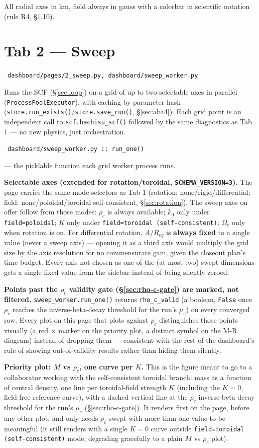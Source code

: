 \documentclass[11pt,a4paper]{scrartcl}
\newcommand{\arrowto}[1]{%
  \par\vspace{2pt}\noindent{\color{linkblue}$\rightarrow$}~\texttt{\small #1}\par\vspace{2pt}}
\newcommand{\code}[1]{\texttt{\small #1}}
\begin{document}
All radial axes in km, field always in gauss with a colorbar in
scientific notation (rule R4, \S1.10).

\section{Tab 2 --- Sweep}
\label{sec:aba2}

\arrowto{dashboard/pages/2\_sweep.py, dashboard/sweep\_worker.py}

Runs the SCF (\S\ref{sec:loop}) on a grid of up to two selectable axes in
parallel (\code{ProcessPoolExecutor}), with caching by parameter hash
(\code{store.run\_exists()}/\code{store.save\_run()}, \S\ref{sec:aba4}).
Each grid point is an independent call to \code{scf.hachisu\_scf()}
followed by the same diagnostics as Tab 1 --- no new physics, just
orchestration.

\arrowto{dashboard/sweep\_worker.py :: run\_one()} --- the picklable function each grid worker process runs.

\textbf{Selectable axes (extended for rotation/toroidal,
\code{SCHEMA\_VERSION=3}).} The page carries the same mode selectors as
Tab 1 (rotation: none/rigid/differential; field: none/poloidal/toroidal
self-consistent, \S\ref{sec:rotation}). The sweep axes on offer follow
from those modes: $\rho_c$ is always available; $k_0$ only under
\code{field=poloidal}; $K$ only under \code{field=toroidal
(self-consistent)}; $\Omega_c$ only when rotation is on. For
differential rotation, $A/R_{eq}$ is \textbf{always fixed} to a single
value (never a sweep axis) --- opening it as a third axis would multiply
the grid size by the axis resolution for no commensurate gain, given the
closeout plan's time budget. Every axis not chosen as one of the (at
most two) swept dimensions gets a single fixed value from the sidebar
instead of being silently zeroed.

\textbf{Points past the $\rho_c$ validity gate (\S\ref{sec:rho-c-gate})
are marked, not filtered.} \code{sweep\_worker.run\_one()} returns
\code{rho\_c\_valid} (a boolean, \code{False} once $\rho_c$ reaches the
inverse-beta-decay threshold for the run's $\mu_e$) on every converged
row. Every plot on this page that plots against $\rho_c$ distinguishes
those points visually (a red $\times$ marker on the priority plot, a
distinct symbol on the M-R diagram) instead of dropping them ---
consistent with the rest of the dashboard's rule of showing
out-of-validity results rather than hiding them silently.

\textbf{Priority plot: $M$ vs $\rho_c$, one curve per $K$.} This is the
figure meant to go to a collaborator working with the self-consistent
toroidal branch: mass as a function of central density, one line per
toroidal-field strength $K$ (including the $K=0$, field-free reference
curve), with a dashed vertical line at the $\rho_c$ inverse-beta-decay
threshold for the run's $\mu_e$ (\S\ref{sec:rho-c-gate}). It renders
first on the page, before any other plot, and only needs $\rho_c$ swept
with more than one value to be meaningful (it still renders with a
single $K=0$ curve outside \code{field=toroidal (self-consistent)} mode,
degrading gracefully to a plain $M$ vs $\rho_c$ plot).
\end{document}
